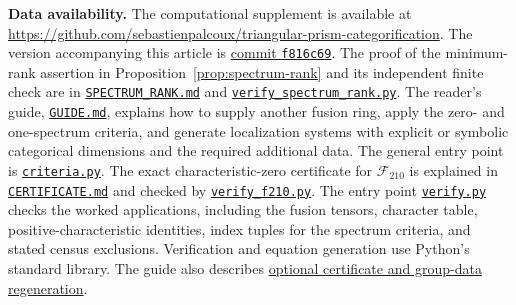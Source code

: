 \documentclass{amsart}
\begin{document}
\medskip
\noindent\textbf{Data availability.} The computational supplement is available at
\url{https://github.com/sebastienpalcoux/triangular-prism-categorification}.
The version accompanying this article is \href{https://github.com/sebastienpalcoux/triangular-prism-categorification/commit/f816c697fde088b261e1fe1ce703980e5dbdab51}{commit \texttt{f816c69}}. The proof of the minimum-rank assertion in Proposition~\ref{prop:spectrum-rank} and its independent finite check are in \href{https://github.com/sebastienpalcoux/triangular-prism-categorification/blob/f816c697fde088b261e1fe1ce703980e5dbdab51/SPECTRUM_RANK.md}{\texttt{SPECTRUM\_RANK.md}} and \href{https://github.com/sebastienpalcoux/triangular-prism-categorification/blob/f816c697fde088b261e1fe1ce703980e5dbdab51/verify_spectrum_rank.py}{\texttt{verify\_spectrum\_rank.py}}.
The reader's guide, \href{https://github.com/sebastienpalcoux/triangular-prism-categorification/blob/f816c697fde088b261e1fe1ce703980e5dbdab51/GUIDE.md}{\texttt{GUIDE.md}}, explains how to supply another fusion ring, apply the zero- and one-spectrum criteria, and generate localization systems with explicit or symbolic categorical dimensions and the required additional data. The general entry point is \href{https://github.com/sebastienpalcoux/triangular-prism-categorification/blob/f816c697fde088b261e1fe1ce703980e5dbdab51/criteria.py}{\texttt{criteria.py}}. The exact characteristic-zero certificate for $\mathcal F_{210}$ is explained in \href{https://github.com/sebastienpalcoux/triangular-prism-categorification/blob/f816c697fde088b261e1fe1ce703980e5dbdab51/CERTIFICATE.md}{\texttt{CERTIFICATE.md}} and checked by \href{https://github.com/sebastienpalcoux/triangular-prism-categorification/blob/f816c697fde088b261e1fe1ce703980e5dbdab51/verify_f210.py}{\texttt{verify\_f210.py}}. The entry point \href{https://github.com/sebastienpalcoux/triangular-prism-categorification/blob/f816c697fde088b261e1fe1ce703980e5dbdab51/verify.py}{\texttt{verify.py}} checks the worked applications, including the fusion tensors, character table, positive-characteristic identities, index tuples for the spectrum criteria, and stated census exclusions. Verification and equation generation use Python's standard library. The guide also describes \href{https://github.com/sebastienpalcoux/triangular-prism-categorification/blob/f816c697fde088b261e1fe1ce703980e5dbdab51/GUIDE.md#5-scope-of-the-certificates-and-optional-regeneration}{optional certificate and group-data regeneration}.
\end{document}
